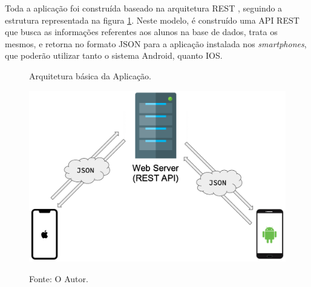 Toda a aplicação foi construída baseado na arquitetura REST \cite{fielding2000}, seguindo a estrutura representada na figura \ref{figura:arqu_basica}. Neste modelo, é construído uma API REST que busca as informações referentes aos alunos na base de dados, trata os mesmos, e retorna no formato JSON para a aplicação instalada nos \textit{smartphones}, que poderão utilizar tanto o sistema Android, quanto IOS.

\begin{figure}[H]
	\caption{Arquitetura básica da Aplicação.}
	\centering %
	\includegraphics[width=12cm]{resources/esquema_web_service.png} %
	\label{figura:arqu_basica}
	\captionsetup{singlelinecheck = false, format= hang, justification=raggedright, labelsep=space, width=12cm}
	\caption*{\footnotesize Fonte: O Autor.}
\end{figure}
